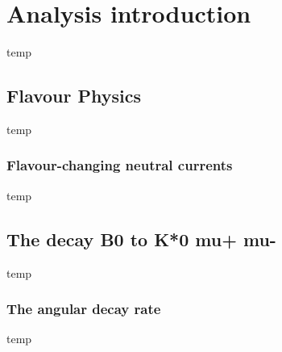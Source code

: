 \chapter{Analysis introduction}
\label{sec:theo}

temp

\section{Flavour Physics}
\label{sec:flav}

temp

\subsection{Flavour-changing neutral currents}
\label{sec:FCNC}

temp

\section{The decay B0 to K*0 mu+ mu-}
\label{sec:Kstmm}

temp

\subsection{The angular decay rate}
\label{sec:decRate}

temp

